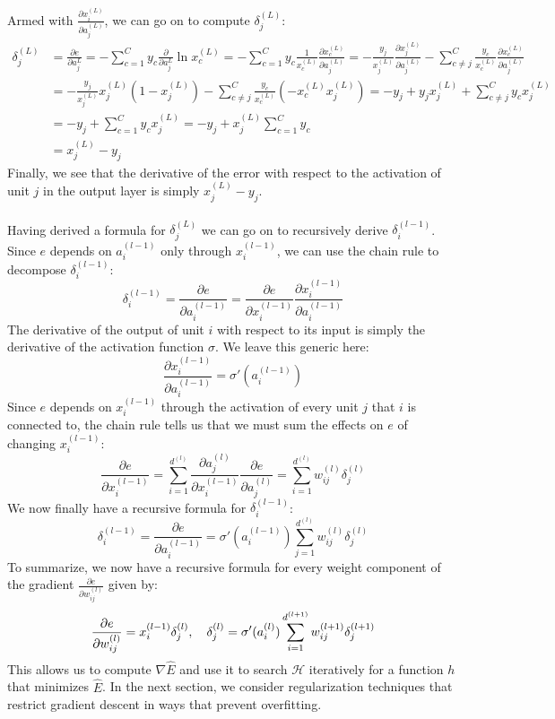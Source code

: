 Armed with $\frac{\partial x^{(L)}_i}{\partial a^{(L)}_j}$, we can go on to compute $\delta^{(L)}_j$:
\begin{align*}
	\delta^{(L)}_j 
	&= \frac{\partial e}{\partial a^{L}_j}
	= - \sum\limits_{c=1}^C y_c \frac{\partial}{\partial a^{L}_j}\ln x^{(L)}_c
	=  - \sum\limits_{c=1}^C y_c \frac{1}{x^{(L)}_c}\frac{\partial x^{(L)}_c}{\partial a^{(L)}_j}
	= - \frac{y_j}{x^{(L)}_j} \frac{\partial x^{(L)}_j}{\partial a^{(L)}_j} - \sum\limits_{c \neq j}^C \frac{y_c}{x^{(L)}_c} \frac{\partial x^{(L)}_c}{\partial a^{(L)}_j}\\
	&= - \frac{y_j}{x^{(L)}_j} x^{(L)}_j(1 - x^{(L)}_j)  - \sum\limits_{c \neq j}^C \frac{y_c}{x^{(L)}_c} (-x^{(L)}_c x^{(L)}_j)
	= - y_j + y_j x^{(L)}_j + \sum\limits_{c \neq j}^C y_c x^{(L)}_j\\
	&= - y_j + \sum\limits_{c = 1}^C y_c x^{(L)}_j
	= - y_j + x^{(L)}_j \sum\limits_{c = 1}^C y_c\\
	&=  x^{(L)}_j - y_j
\end{align*}
Finally, we see that the derivative of the error with respect to the activation of unit $j$ in the output layer is simply $x^{(L)}_j - y_j$.
\\\\
Having derived a formula for $\delta^{(L)}_j$ we can go on to recursively derive $\delta^{(l-1)}_i$. Since $e$ depends on $a^{(l-1)}_i$ only through $x^{(l-1)}_i$, we can use the chain rule to decompose $\delta^{(l-1)}_i$:
$$
\delta^{(l-1)}_i = \frac{\partial e}{\partial a^{(l-1)}_i} = \frac{\partial e}{\partial x^{(l-1)}_i} \frac{\partial x^{(l-1)}_i}{\partial a^{(l-1)}_i}
$$
The derivative of the output of unit $i$ with respect to its input is simply the derivative of the activation function $\sigma$. We leave this generic here:
$$
\frac{\partial x^{(l-1)}_i}{\partial a^{(l-1)}_i} = \sigma'(a^{(l-1)}_i)
$$
Since $e$ depends on $x^{(l-1)}_i$ through the activation of every unit $j$ that $i$ is connected to, the chain rule tells us that we must sum the effects on $e$ of changing $x^{(l-1)}_i$:
$$
\frac{\partial e}{\partial x^{(l-1)}_i} 
= \sum\limits_{i=1}^{d^{(l)}} \frac{\partial a^{(l)}_j}{\partial x^{(l-1)}_i} \frac{\partial e}{\partial a^{(l)}_j}
= \sum\limits_{i=1}^{d^{(l)}} w^{(l)}_{ij} \delta^{(l)}_j
$$
We now finally have a recursive formula for $\delta^{(l-1)}_i$:
$$
\delta^{(l-1)}_i = \frac{\partial e}{\partial a^{(l-1)}_i}
= \sigma'(a^{(l-1)}_i) \sum\limits_{j=1}^{d^{(l)}} w^{(l)}_{ij} \delta^{(l)}_j
$$
To summarize, we now have a recursive formula for every weight component of the gradient $\frac{\partial e}{\partial w^{(l)}_{ij}}$ given by:
$$
\frac{\partial e}{\partial w^{(l)}_{ij}} = x^{(l-1)}_i \delta^{(l)}_j,\quad \delta^{(l)}_j = \sigma'(a^{(l)}_i) \sum\limits_{i=1}^{d^{(l+1)}} w^{(l+1)}_{ij} \delta^{(l+1)}_j
$$
This allows us to compute $\nabla\hat{E}$ and use it to search $\mathcal{H}$ iteratively for a function $h$ that minimizes $\hat{E}$. In the next section, we consider regularization techniques that restrict gradient descent in ways that prevent overfitting.

